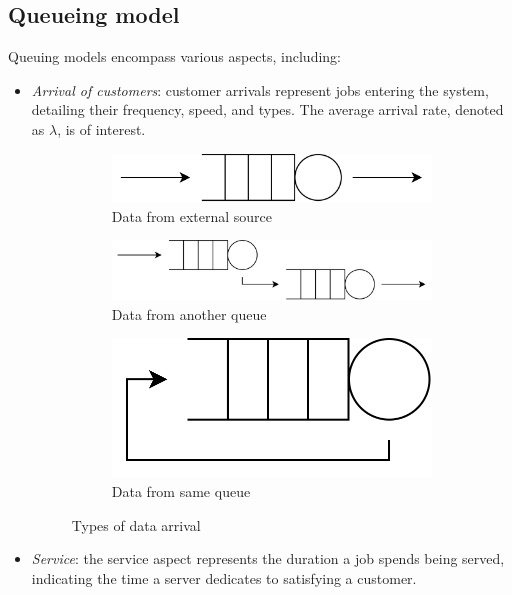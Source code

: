 \subsection{Queueing model}
Queuing models encompass various aspects, including:
\begin{itemize}
    \item \textit{Arrival of customers}: customer arrivals represent jobs entering the system, detailing their frequency, speed, and types. 
        The average arrival rate, denoted as $\lambda$, is of interest.
        \begin{figure}[H]
            \centering
            \begin{subfigure}{0.32\textwidth}
                \centering
                \includegraphics[width=1\linewidth]{images/ext.png} 
                \caption{Data from external source}
            \end{subfigure}
            \begin{subfigure}{0.32\textwidth}
                \centering
                \includegraphics[width=1\linewidth]{images/ext1.png} 
                \caption{Data from another queue}
            \end{subfigure}
            \begin{subfigure}{0.32\textwidth}
                \centering
                \includegraphics[width=0.6\linewidth]{images/ext2.png}
                \caption{Data from same queue}
            \end{subfigure}
            \caption{Types of data arrival}
        \end{figure}
    \item \textit{Service}: the service aspect represents the duration a job spends being served, indicating the time a server dedicates to satisfying a customer.

\end{itemize}
